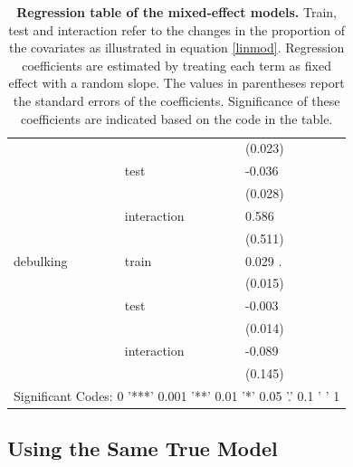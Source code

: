 \documentclass{bioinfo}
\begin{document}
\begin{table}[t]
\begin{tabular}{llll}
          &       & (0.023) &  \\
          & test  & -0.036 &  \\
          &       & (0.028) &  \\
          & interaction & 0.586 &  \\
          &       & (0.511) &  \\
    debulking & train & 0.029 . &  \\
          &       & (0.015) &  \\
          & test  & -0.003 &  \\
          &       & (0.014) &  \\
          & interaction & -0.089 &  \\
          &       & (0.145) &  \\
	\hline    
    \multicolumn{4}{c}{Significant Codes: 0 '***' 0.001 '**' 0.01 '*' 0.05 '.' 0.1 ' ' 1} \\
    \bottomrule
    \end{tabular}%
  \caption{\textbf{Regression table of the mixed-effect models.} Train, test and interaction refer to the changes in the proportion of the covariates as illustrated in equation \ref{linmod}. Regression coefficients are estimated by treating each term as fixed effect with a random slope. The values in parentheses report the standard errors of the coefficients. Significance of these coefficients are indicated based on the code in the table.}
  \label{regress-table}%
\end{table}%

  \subsection{Using the Same True Model}
  
\end{document}
